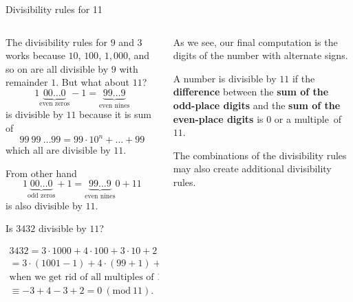 \documentclass[9pt,aspectratio=169]{beamer}
\newcommand{\Mod}[1]{\ (\mathrm{mod}\ #1)}
\begin{document}
\begin{frame}{Divisibility rules for 11}
  \begin{columns}[T]
    \begin{column}{0.5\textwidth}
      The divisibility rules for $9$ and $3$ works because $10$, $100$, $1{,}000$, and so on are all divisible by $9$ with remainder $1$. But what about $11$?
      \[ 1\underbrace{00\ldots 0}_\text{even zeros} - 1 = \underbrace{99 \ldots 9}_\text{even nines} \]
      is divisible by $11$ because it is sum of
      \[ 99\ 99\ \ldots 99 = 99\cdot 10^n + \ldots + 99 \] which all are divisible by $11$.

      From other hand
      \[ 1\underbrace{00\ldots 0}_\text{odd zeros} + 1 = \underbrace{99\ldots 9}_\text{even nines}0 + 11 \]
      is also divisible by $11$.

      \begin{problem}
        Is $3432$ divisible by $11$?
      \end{problem}
      \vspace*{-1em}
      \begin{multline*}
        3432 = 3 \cdot 1000 + 4 \cdot 100 + 3 \cdot 10 + 2 = \\
        = 3 \cdot (1001 - 1) + 4 \cdot (99 + 1) + 3 \cdot (11 - 1) + 2 \equiv \\
        \text{when we get rid of all multiples of 11} \\
        \equiv -3 + 4 - 3 + 2 = 0 \Mod{11}.
      \end{multline*}
    \end{column}
    \begin{column}{0.5\textwidth}
      As we see, our final computation is the digits of the number with alternate signs.
      \begin{definition}
        A number is divisible by $11$ if the \textbf{difference} between the \textbf{sum of the odd-place digits} and the \textbf{sum of the even-place digits} is $0$ or a multiple~of~$11$.
      \end{definition}\medskip

      The combinations of the divisibility rules may also create additional divisibility rules. 


\end{column}
\end{columns}
\end{frame}
\end{document}
